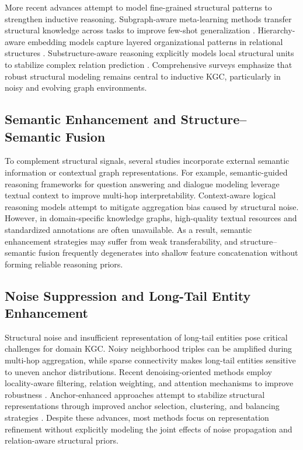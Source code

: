 \documentclass[preprint,12pt]{elsarticle}
\begin{document}
More recent advances attempt to model fine-grained structural patterns to strengthen inductive reasoning. Subgraph-aware meta-learning methods transfer structural knowledge across tasks to improve few-shot generalization \cite{meta-subgraph}. Hierarchy-aware embedding models capture layered organizational patterns in relational structures \cite{hierarchy-aware}. Substructure-aware reasoning explicitly models local structural units to stabilize complex relation prediction \cite{substructure-aware}. Comprehensive surveys \cite{survey-ikgc} emphasize that robust structural modeling remains central to inductive KGC, particularly in noisy and evolving graph environments.

\subsection{Semantic Enhancement and Structure–Semantic Fusion}

To complement structural signals, several studies incorporate external semantic information or contextual graph representations. For example, semantic-guided reasoning frameworks for question answering and dialogue modeling \cite{qa-gnn,dialogkg} leverage textual context to improve multi-hop interpretability. Context-aware logical reasoning models \cite{context-logic} attempt to mitigate aggregation bias caused by structural noise. However, in domain-specific knowledge graphs, high-quality textual resources and standardized annotations are often unavailable. As a result, semantic enhancement strategies may suffer from weak transferability, and structure–semantic fusion frequently degenerates into shallow feature concatenation without forming reliable reasoning priors.

\subsection{Noise Suppression and Long-Tail Entity Enhancement}

Structural noise and insufficient representation of long-tail entities pose critical challenges for domain KGC. Noisy neighborhood triples can be amplified during multi-hop aggregation, while sparse connectivity makes long-tail entities sensitive to uneven anchor distributions. Recent denoising-oriented methods employ locality-aware filtering, relation weighting, and attention mechanisms to improve robustness \cite{locality-aware-pattern,structure-attn,multi-level-sampling}. Anchor-enhanced approaches attempt to stabilize structural representations through improved anchor selection, clustering, and balancing strategies \cite{relation-aware-anchor,one-subgraph,conee,multi-granularity,hierarchical-reconstruct}. Despite these advances, most methods focus on representation refinement without explicitly modeling the joint effects of noise propagation and relation-aware structural priors.
\end{document}
